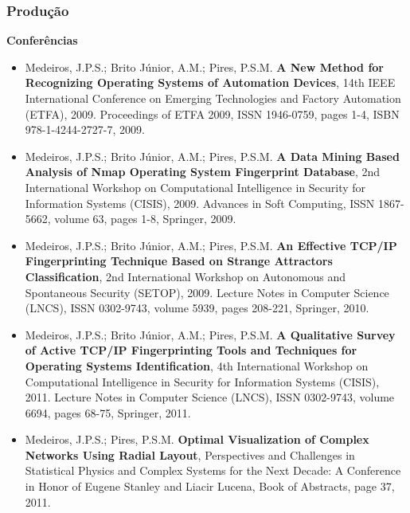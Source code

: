 \documentclass[10pt]{beamer}
\newcommand\fontvii{\fontsize{8}{7.2}\selectfont}
\begin{document}
\begin{frame}
    \frametitle{Produção}\fontvii

{\bf Conferências}

\begin{itemize}
\item Medeiros, J.P.S.; Brito Júnior, A.M.; Pires, P.S.M.
    {\bf A New Method for Recognizing Operating Systems of Automation
    Devices},
    14th IEEE International Conference on Emerging Technologies and Factory
    Automation (ETFA), 2009.
    Proceedings of ETFA 2009, ISSN 1946-0759, pages 1-4,
    ISBN 978-1-4244-2727-7, 2009.
\item Medeiros, J.P.S.; Brito Júnior, A.M.; Pires, P.S.M.
    {\bf A Data Mining Based Analysis of Nmap Operating System Fingerprint
    Database},
    2nd International Workshop on Computational Intelligence in Security for
    Information Systems (CISIS), 2009.
    Advances in Soft Computing, ISSN 1867-5662, volume 63, pages 1-8,
    Springer, 2009.
\item Medeiros, J.P.S.; Brito Júnior, A.M.; Pires, P.S.M.
    {\bf An Effective TCP/IP Fingerprinting Technique Based on Strange
    Attractors Classification},
    2nd International Workshop on Autonomous and Spontaneous Security
    (SETOP), 2009.
    Lecture Notes in Computer Science (LNCS), ISSN 0302-9743, volume 5939,
    pages 208-221, Springer, 2010.
\item Medeiros, J.P.S.; Brito Júnior, A.M.; Pires, P.S.M.
    {\bf A Qualitative Survey of Active TCP/IP Fingerprinting Tools and
    Techniques for Operating Systems Identification},
    4th International Workshop on Computational Intelligence in Security for
    Information Systems (CISIS), 2011.
    Lecture Notes in Computer Science (LNCS), ISSN 0302-9743, volume 6694,
    pages 68-75, Springer, 2011.
\item Medeiros, J.P.S.; Pires, P.S.M.
    {\bf Optimal Visualization of Complex Networks Using Radial Layout},
    Perspectives and Challenges in Statistical Physics and Complex Systems
    for the Next Decade: A Conference in Honor of Eugene Stanley and Liacir
    Lucena, Book of Abstracts, page 37, 2011.
\end{itemize}

\end{frame}
\end{document}
